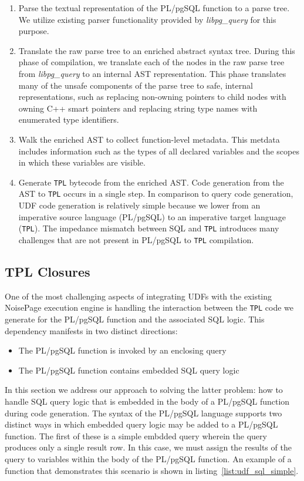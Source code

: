 \documentclass{vldb}
\newcommand{\tpl}{\texttt{TPL}\xspace}
\newcommand{\plpgsql}{PL/pgSQL\xspace}
\begin{document}
\begin{enumerate}
    \item Parse the textual representation of the \plpgsql function to a parse tree. We utilize existing parser functionality provided by \textit{libpg\_query} for this purpose.
    \item Translate the raw parse tree to an enriched abstract syntax tree. During this phase of compilation, we translate each of the nodes in the raw parse tree from \textit{libpg\_query} to an internal AST representation. This phase translates many of the unsafe components of the parse tree to safe, internal representations, such as replacing non-owning pointers to child nodes with owning C++ smart pointers and replacing string type names with enumerated type identifiers.
    \item Walk the enriched AST to collect function-level metadata. This metdata includes information such as the types of all declared variables and the scopes in which these variables are visible.
    \item Generate \tpl bytecode from the enriched AST. Code generation from the AST to \tpl occurs in a single step. In comparison to query code generation, UDF code generation is relatively simple because we lower from an imperative source language (\plpgsql) to an imperative target language (\tpl). The impedance mismatch between SQL and \tpl introduces many challenges that are not present in \plpgsql to \tpl compilation.
\end{enumerate}

\subsection{TPL Closures}

One of the most challenging aspects of integrating UDFs with the existing NoisePage execution engine is handling the interaction between the \tpl code we generate for the \plpgsql function and the associated SQL logic. This dependency manifests in two distinct directions:

\begin{itemize}
    \item The \plpgsql function is invoked by an enclosing query
    \item The \plpgsql function contains embedded SQL query logic
\end{itemize}

In this section we address our approach to solving the latter problem: how to handle SQL query logic that is embedded in the body of a \plpgsql function during code generation. The syntax of the \plpgsql language supports two distinct ways in which embedded query logic may be added to a \plpgsql function. The first of these is a simple embdded query wherein the query produces only a single result row. In this case, we must assign the results of the query to variables within the body of the \plpgsql function. An example of a function that demonstrates this scenario is shown in listing~\ref{list:udf_sql_simple}.
\end{document}
